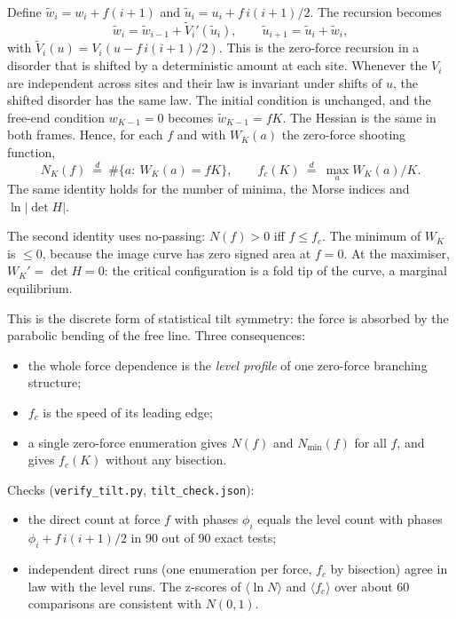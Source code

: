 \documentclass[10pt,a4paper]{article}
\begin{document}
Define $\tilde w_i=w_i+f(i+1)$ and $\tilde u_i=u_i+f\,i(i+1)/2$. The recursion becomes
\[
\tilde w_i=\tilde w_{i-1}+\tilde V_i'(\tilde u_i),\qquad \tilde u_{i+1}=\tilde u_i+\tilde w_i,
\]
with $\tilde V_i(u)=V_i(u-f\,i(i+1)/2)$.
This is the zero-force recursion in a disorder that is shifted by a deterministic amount at each site.
Whenever the $V_i$ are independent across sites and their law is invariant under shifts of $u$, the shifted disorder has the same law.
The initial condition is unchanged, and the free-end condition $w_{K-1}=0$ becomes $\tilde w_{K-1}=fK$.
The Hessian is the same in both frames.
Hence, for each $f$ and with $W_K(a)$ the zero-force shooting function,
\begin{equation}
N_K(f)\ \overset{d}{=}\ \#\{a:\ W_K(a)=fK\},\qquad
f_c(K)\ \overset{d}{=}\ \max_aW_K(a)/K .
\label{eq:sts}
\end{equation}
The same identity holds for the number of minima, the Morse indices and $\ln|\det H|$.

The second identity uses no-passing: $N(f)>0$ iff $f\le f_c$.
The minimum of $W_K$ is $\le0$, because the image curve has zero signed area at $f=0$.
At the maximiser, $W_K'=\det H=0$: the critical configuration is a fold tip of the curve, a marginal equilibrium.

This is the discrete form of statistical tilt symmetry: the force is absorbed by the parabolic bending of the free line.
Three consequences:
\begin{itemize}
\item the whole force dependence is the \emph{level profile} of one zero-force branching structure;
\item $f_c$ is the speed of its leading edge;
\item a single zero-force enumeration gives $N(f)$ and $N_{\min}(f)$ for all $f$, and gives $f_c(K)$ without any bisection.
\end{itemize}

Checks (\texttt{verify\_tilt.py}, \texttt{tilt\_check.json}):
\begin{itemize}
\item the direct count at force $f$ with phases $\phi_i$ equals the level count with phases $\phi_i+f\,i(i+1)/2$ in 90 out of 90 exact tests;
\item independent direct runs (one enumeration per force, $f_c$ by bisection) agree in law with the level runs. The z-scores of $\langle\ln N\rangle$ and $\langle f_c\rangle$ over about 60 comparisons are consistent with $N(0,1)$.
\end{itemize}
\end{document}
